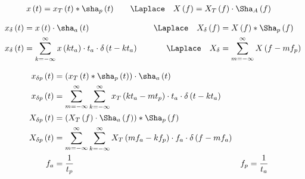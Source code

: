 \begin{boxleft}
\end{boxleft}\begin{boxrightshaded}
\begin{align*}
x\left(t\right)&=x_T\left(t\right)\ast\sha_p\left(t\right)\quad&\Laplace\quad X\left(f\right)&=X_T\left(f\right)\cdot \Sha_A\left(f\right)
\end{align*}
\end{boxrightshaded}

\begin{boxleft}
\end{boxleft}\begin{boxrightshaded}
\begin{align*}
x_\delta\left(t\right)&=x\left(t\right)\cdot\sha_a\left(t\right)\quad&\Laplace\quad X_\delta\left(f\right)&=X\left(f\right)\ast\Sha_p\left(f\right)\\
x_\delta\left(t\right)&=\sum_{k=-\infty}^{\infty}x\left(kt_a\right)\cdot t_a\cdot \delta\left(t-kt_a\right)\quad&\Laplace\quad X_\delta&=\sum_{m=-\infty}^{\infty}X\left(f-mf_p\right)
\end{align*}
\end{boxrightshaded}


\begin{boxleft}
\end{boxleft}\begin{boxrightshaded}
\begin{align*}
x_{\delta p}\left(t\right)&=\left(x_T\left(t\right)\ast\sha_p\left(t\right)\right)\cdot\sha_a\left(t\right) \\
x_{\delta p}\left(t\right)&=\sum_{m=-\infty}^\infty\sum_{k=-\infty}^\infty x_T\left(kt_a-mt_p\right)\cdot t_a\cdot \delta\left(t-kt_a\right)\\
X_{\delta p}\left(t\right)&=\left(X_T\left(f\right)\cdot \Sha_a\left(f\right)\right)\ast\Sha_p\left(f\right)\\
X_{\delta p}\left(t\right)&=\sum_{m=-\infty}^\infty\sum_{k=-\infty}^\infty X_T\left(mf_a-kf_p\right)\cdot f_a\cdot \delta\left(f-mf_a\right)\\
f_a&=\frac{1}{t_p}&f_p&=\frac{1}{t_a}
\end{align*}
\end{boxrightshaded}

